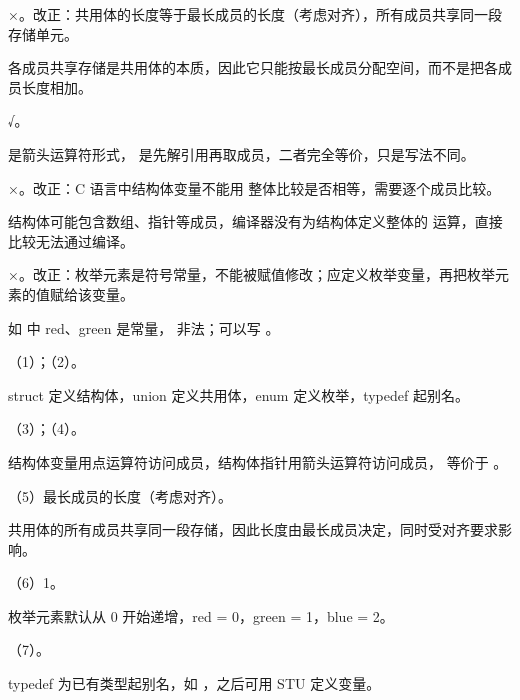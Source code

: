 \documentclass[a4paper,11pt]{article}
\begin{document}
\q ×。改正：共用体的长度等于最长成员的长度（考虑对齐），所有成员共享同一段存储单元。\begin{analysis}各成员共享存储是共用体的本质，因此它只能按最长成员分配空间，而不是把各成员长度相加。\end{analysis}

\q √。\begin{analysis} 是箭头运算符形式， 是先解引用再取成员，二者完全等价，只是写法不同。\end{analysis}

\q ×。改正：C 语言中结构体变量不能用 \code{==} 整体比较是否相等，需要逐个成员比较。\begin{analysis}结构体可能包含数组、指针等成员，编译器没有为结构体定义整体的 \code{==} 运算，直接比较无法通过编译。\end{analysis}

\q ×。改正：枚举元素是符号常量，不能被赋值修改；应定义枚举变量，再把枚举元素的值赋给该变量。\begin{analysis}如  中 red、green 是常量， 非法；可以写 。\end{analysis}


\q （1）；（2）。\begin{analysis}struct 定义结构体，union 定义共用体，enum 定义枚举，typedef 起别名。\end{analysis}

\q （3）；（4）\code{->}。\begin{analysis}结构体变量用点运算符访问成员，结构体指针用箭头运算符访问成员， 等价于 。\end{analysis}

\q （5）最长成员的长度（考虑对齐）。\begin{analysis}共用体的所有成员共享同一段存储，因此长度由最长成员决定，同时受对齐要求影响。\end{analysis}

\q （6）1。\begin{analysis}枚举元素默认从 0 开始递增，red = 0，green = 1，blue = 2。\end{analysis}

\q （7）。\begin{analysis}typedef 为已有类型起别名，如 ，之后可用 STU 定义变量。\end{analysis}
\end{document}
